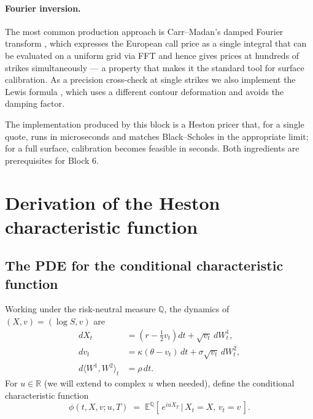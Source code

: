 \documentclass[11pt]{article}
\theoremstyle{plain}
\theoremstyle{definition}
\theoremstyle{remark}
\begin{document}
\paragraph{Fourier inversion.} The most common production approach is Carr--Madan's damped Fourier transform \cite{CarrMadan1999}, which expresses the European call price as a single integral that can be evaluated on a uniform grid via FFT and hence gives prices at hundreds of strikes simultaneously --- a property that makes it the standard tool for surface calibration. As a precision cross-check at single strikes we also implement the Lewis formula \cite{Lewis2000}, which uses a different contour deformation and avoids the damping factor.

The implementation produced by this block is a Heston pricer that, for a single quote, runs in microseconds and matches Black--Scholes in the appropriate limit; for a full surface, calibration becomes feasible in seconds. Both ingredients are prerequisites for Block 6.

\section{Derivation of the Heston characteristic function}

\subsection{The PDE for the conditional characteristic function}

Working under the risk-neutral measure \(\mathbb{Q}\), the dynamics of \((X, v) = (\log S, v)\) are
\begin{align}
    dX_t &= \left(r - \tfrac{1}{2} v_t\right) dt + \sqrt{v_t}\, dW^1_t,                         \label{eq:X-dyn}\\
    dv_t &= \kappa(\theta - v_t)\, dt + \sigma\sqrt{v_t}\, dW^2_t,                              \label{eq:v-dyn}\\
    d\langle W^1, W^2\rangle_t &= \rho\, dt.                                                    \label{eq:rho-dyn}
\end{align}
For \(u \in \mathbb{R}\) (we will extend to complex \(u\) when needed), define the conditional characteristic function
\[
    \phi(t, X, v; u, T) \;=\; \mathbb{E}^{\mathbb{Q}}\!\left[\,e^{i u X_T}\,\big|\,X_t = X,\,v_t = v\,\right].
\]
\end{document}
